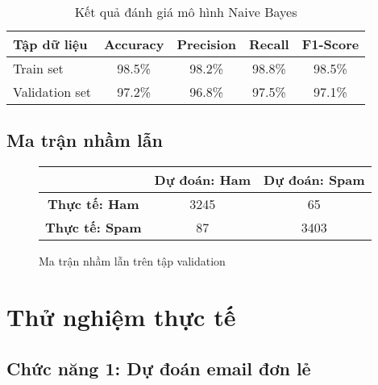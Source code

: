 \begin{table}[H]
\centering
\begin{tabular}{|l|c|c|c|c|}
\hline
\textbf{Tập dữ liệu} & \textbf{Accuracy} & \textbf{Precision} & \textbf{Recall} & \textbf{F1-Score} \\
\hline
Train set & 98.5\% & 98.2\% & 98.8\% & 98.5\% \\
\hline
Validation set & 97.2\% & 96.8\% & 97.5\% & 97.1\% \\
\hline
\end{tabular}
\caption{Kết quả đánh giá mô hình Naive Bayes}
\label{tab:results}
\end{table}

\subsection{Ma trận nhầm lẫn}

\begin{figure}[H]
\centering
\begin{tabular}{|c|c|c|}
\hline
& \textbf{Dự đoán: Ham} & \textbf{Dự đoán: Spam} \\
\hline
\textbf{Thực tế: Ham} & 3245 & 65 \\
\hline
\textbf{Thực tế: Spam} & 87 & 3403 \\
\hline
\end{tabular}
\caption{Ma trận nhầm lẫn trên tập validation}
\label{fig:confusion_matrix}
\end{figure}

\section{Thử nghiệm thực tế}

\subsection{Chức năng 1: Dự đoán email đơn lẻ}

